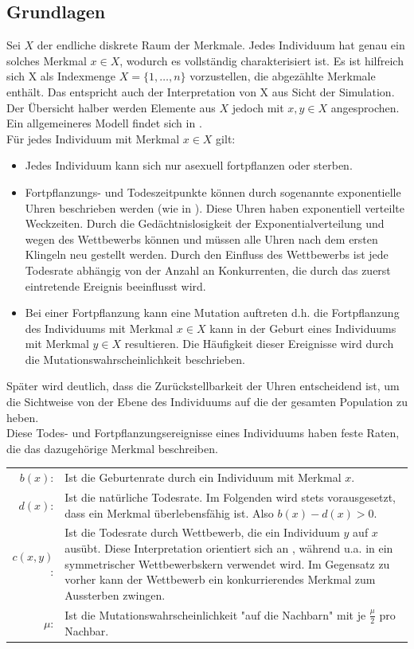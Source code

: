 \documentclass[11pt, a4paper, german]{article}
\theoremstyle{plain}
\begin{document}
	\subsection{Grundlagen}
	Sei $ X $ der endliche diskrete Raum der Merkmale. Jedes Individuum hat genau ein solches Merkmal $ x \in X $, wodurch es vollständig charakterisiert ist. Es ist hilfreich sich X als Indexmenge $ X = \{1,\dots, n\} $ vorzustellen, die abgezählte Merkmale enthält. Das entspricht auch der Interpretation von X aus Sicht der Simulation. Der Übersicht halber werden Elemente aus $ X $ jedoch mit $ x,y \in X $ angesprochen. Ein allgemeineres Modell findet sich in \cite{raey}.\\
	Für jedes Individuum mit Merkmal $ x \in X $ gilt:
	\begin{itemize}
		\item Jedes Individuum kann sich nur asexuell fortpflanzen oder sterben.
		\item Fortpflanzungs- und Todeszeitpunkte können durch sogenannte exponentielle Uhren beschrieben werden (wie in \cite[S. 3]{fournier2004microscopic}). Diese Uhren haben exponentiell verteilte Weckzeiten. Durch die Gedächtnislosigkeit der Exponentialverteilung und wegen des Wettbewerbs können und müssen alle Uhren nach dem ersten Klingeln neu gestellt werden. Durch den Einfluss des Wettbewerbs ist jede Todesrate abhängig von der Anzahl an Konkurrenten, die durch das zuerst eintretende Ereignis beeinflusst wird. 
		\item Bei einer Fortpflanzung kann eine Mutation auftreten d.h. die Fortpflanzung des Individuums mit Merkmal $ x \in X $ kann in der Geburt eines Individuums mit Merkmal $ y \in X $ resultieren. Die Häufigkeit dieser Ereignisse wird durch die Mutationswahrscheinlichkeit beschrieben.
	\end{itemize}
	Später wird deutlich, dass die Zurückstellbarkeit der Uhren entscheidend ist, um die Sichtweise von der Ebene des Individuums auf die der gesamten Population zu heben.\\
	Diese Todes- und Fortpflanzungsereignisse eines Individuums haben feste Raten, die das dazugehörige Merkmal beschreiben.\\
	
	\begin{tabular}{r p{26em}}
		$ b(x) $: & Ist die Geburtenrate durch ein Individuum mit Merkmal $ x $.\\
		$ d(x) $: & Ist die natürliche Todesrate. Im Folgenden wird stets vorausgesetzt, dass ein Merkmal überlebensfähig ist. Also $ b(x) - d(x) > 0 $.\\
		$ c(x, y) $: & Ist die Todesrate durch Wettbewerb, die ein Individuum $ y $ auf $ x $ ausübt. Diese Interpretation orientiert sich an \cite{raey}, während u.a. in \cite{Champagnat20061127} ein symmetrischer Wettbewerbskern verwendet wird. Im Gegensatz zu vorher kann der Wettbewerb ein konkurrierendes Merkmal zum Aussterben zwingen.\\
		$ \mu $: & Ist die Mutationswahrscheinlichkeit "{}auf die Nachbarn"{} mit je $ \frac{\mu}{2} $ pro Nachbar. \\
	\end{tabular}\\
\end{document}
